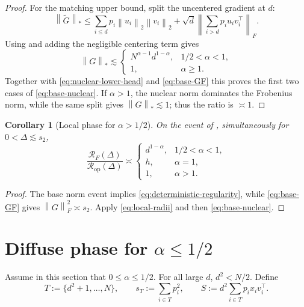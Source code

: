 \documentclass[11pt]{article}
\newtheorem{corollary}[corollary]{Corollary}
\theoremstyle{definition}
\newcommand{\norm}[1]{\left\lVert #1\right\rVert_2}
\newcommand{\normF}[1]{\left\lVert #1\right\rVert_F}
\newcommand{\normnuc}[1]{\left\lVert #1\right\rVert_*}
\begin{document}
\begin{proof}
For the matching upper bound, split the uncentered gradient at $d$:
\[
 \normnuc{\widetilde G}
 \leq \sum_{i\leq d}p_i\norm{u_i}\norm{v_i}
 +\sqrt d\normF{\sum_{i>d}p_i u_iv_i^\top}.
\]
Using  and adding the negligible centering
term gives
\[
 \normnuc{G}\lesssim
 \begin{cases}
 N^{\alpha-1}d^{1-\alpha},&1/2<\alpha<1,\\
 1,&\alpha\geq1.
 \end{cases}
\]
Together with \eqref{eq:nuclear-lower-head} and
\eqref{eq:base-GF} this proves the first two cases of
\eqref{eq:base-nuclear}.  If $\alpha>1$, the nuclear norm dominates the
Frobenius norm, while the same split gives $\normnuc{G}\lesssim1$;
thus the ratio is $\asymp1$.
\end{proof}

\begin{corollary}[Local phase for $\alpha>1/2$]
\label{cor:local-phase}
On the event of , simultaneously for
$0<\Delta\lesssim s_2$,
\[
 \frac{\mathcal R_F(\Delta)}
 {\mathcal R_{\mathrm{op}}(\Delta)}
 \asymp
 \begin{cases}
 d^{1-\alpha},&1/2<\alpha<1,\\
 h,&\alpha=1,\\
 1,&\alpha>1.
 \end{cases}
\]
\end{corollary}

\begin{proof}
The base norm event implies \eqref{eq:deterministic-regularity}, while
\eqref{eq:base-GF} gives $\normF{G}^2\asymp s_2$.  Apply
\eqref{eq:local-radii} and then \eqref{eq:base-nuclear}.
\end{proof}

\section{Diffuse phase for \texorpdfstring{$\alpha\leq1/2$}{alpha <= 1/2}}

Assume in this section that $0\leq\alpha\leq1/2$.  For all large $d$,
$d^2<N/2$.  Define
\begin{equation}
 T:=\{d^2+1,\ldots,N\},
 \qquad s_T:=\sum_{i\in T}p_i^2,
 \qquad S:=d^2\sum_{i\in T}p_i x_iv_i^\top.
 \label{eq:diffuse-def}
\end{equation}
\end{document}
